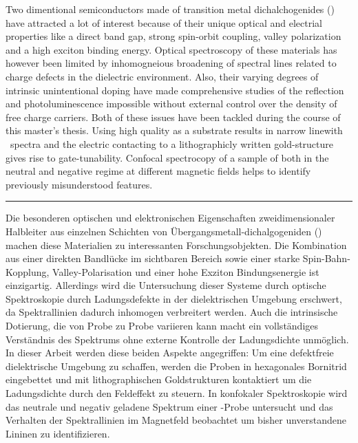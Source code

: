 
Two dimentional semiconductors made of transition metal dichalchogenides (\tmds\!) have attracted a lot of interest because of their unique optical and electrial properties like a direct band gap, strong spin-orbit coupling, valley polarization and a high exciton binding energy. Optical spectroscopy of these materials has however been limited by inhomogneious broadening of spectral lines related to charge defects in the dielectric environment. Also, their varying degrees of intrinsic unintentional doping have made comprehensive studies of the reflection and photoluminescence impossible without external control over the density of free charge carriers. Both of these issues have been tackled during the course of this master's thesis. Using high quality \hbng as a substrate results in narrow linewith \pl\ spectra and the electric contacting to a lithographicly written gold-structure gives rise to gate-tunability. Confocal spectrocopy of a sample of \wse both in the neutral and negative regime at different magnetic fields helps to identify previously misunderstood features.\newline
\begin{center}
\par\rule[8pt]{0.7\textwidth}{0.5pt}
\end{center}
Die besonderen optischen und elektronischen Eigenschaften zweidimensionaler Halbleiter aus einzelnen Schichten von Übergangsmetall-dichalgogeniden (\tmds\!) machen diese Materialien zu interessanten Forschungsobjekten. Die Kombination aus einer direkten Bandlücke im sichtbaren Bereich sowie einer starke Spin-Bahn-Kopplung, Valley-Polarisation und einer hohe Exziton Bindungsenergie ist einzigartig. Allerdings wird die Untersuchung dieser Systeme durch optische Spektroskopie durch Ladungsdefekte in der dielektrischen Umgebung erschwert, da Spektrallinien dadurch inhomogen verbreitert werden. Auch die intrinsische Dotierung, die von Probe zu Probe variieren kann macht ein vollständiges Verständnis des Spektrums ohne externe Kontrolle der Ladungsdichte unmöglich. In dieser Arbeit werden diese beiden Aspekte angegriffen: Um eine defektfreie dielektrische Umgebung zu schaffen, werden die Proben in hexagonales Bornitrid eingebettet und mit lithographischen Goldstrukturen kontaktiert um die Ladungsdichte durch den Feldeffekt zu steuern. In konfokaler Spektroskopie wird das neutrale und negativ geladene Spektrum einer \wse\!-Probe untersucht und das Verhalten der Spektrallinien im Magnetfeld beobachtet um bisher unverstandene Lininen zu identifizieren.